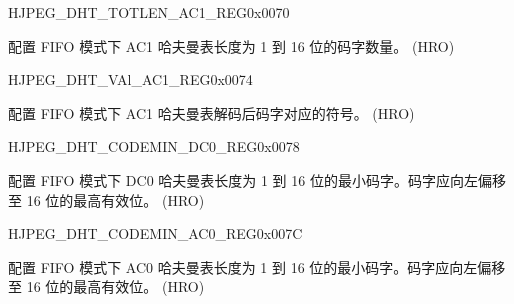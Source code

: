 \begin{register}{H}{JPEG\_DHT\_TOTLEN\_AC1\_REG}{0x0070}\label{regdesc:JPEGDHTTOTLENAC1REG}
%
\regnewline%
\begin{regdesc}\begin{reglist}
\label{fielddesc:JPEGDHTTOTLENAC1}\item [JPEG\_DHT\_TOTLEN\_AC1] 配置 FIFO 模式下 AC1 哈夫曼表长度为 1 到 16 位的码字数量。 (HRO)
\end{reglist}\end{regdesc}
\end{register}


\begin{register}{H}{JPEG\_DHT\_VAl\_AC1\_REG}{0x0074}\label{regdesc:JPEGDHTVALAC1REG}
%
\regnewline%
\begin{regdesc}\begin{reglist}
\label{fielddesc:JPEGDHTVALAC1}\item [JPEG\_DHT\_VAL\_AC1] 配置 FIFO 模式下 AC1 哈夫曼表解码后码字对应的符号。 (HRO)
\end{reglist}\end{regdesc}
\end{register}


\begin{register}{H}{JPEG\_DHT\_CODEMIN\_DC0\_REG}{0x0078}\label{regdesc:JPEGDHTCODEMINDC0REG}
%
\regnewline%
\begin{regdesc}\begin{reglist}
\label{fielddesc:JPEGDHTCODEMINDC0}\item [JPEG\_DHT\_CODEMIN\_DC0] 配置 FIFO 模式下 DC0 哈夫曼表长度为 1 到 16 位的最小码字。码字应向左偏移至 16 位的最高有效位。 (HRO)
\end{reglist}\end{regdesc}
\end{register}


\begin{register}{H}{JPEG\_DHT\_CODEMIN\_AC0\_REG}{0x007C}\label{regdesc:JPEGDHTCODEMINAC0REG}
%
\regnewline%
\begin{regdesc}\begin{reglist}
\label{fielddesc:JPEGDHTCODEMINAC0}\item [JPEG\_DHT\_CODEMIN\_AC0] 配置 FIFO 模式下 AC0 哈夫曼表长度为 1 到 16 位的最小码字。码字应向左偏移至 16 位的最高有效位。 (HRO)
\end{reglist}\end{regdesc}
\end{register}


